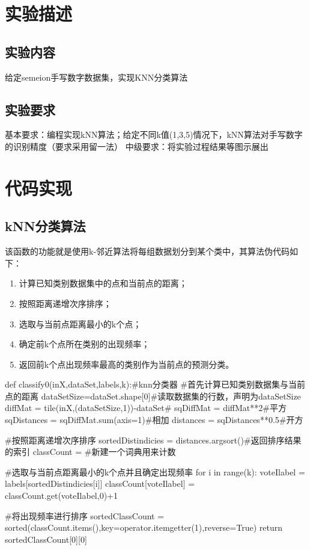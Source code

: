 \documentclass[UTF8,a4paper,10pt]{ctexart}
\begin{document}
\section{实验描述}
\subsection{实验内容}
给定semeion手写数字数据集，实现KNN分类算法
\subsection{实验要求}
基本要求：编程实现kNN算法；给定不同k值(1,3,5)情况下，kNN算法对手写数字的识别精度（要求采用留一法）
中级要求：将实验过程结果等图示展出

\section{代码实现}
\subsection{kNN分类算法}

该函数的功能就是使用k-邻近算法将每组数据划分到某个类中，其算法伪代码如下：

\begin{enumerate}
   \item 计算已知类别数据集中的点和当前点的距离；
   \item 按照距离递增次序排序；
   \item 选取与当前点距离最小的k个点；
   \item 确定前k个点所在类别的出现频率；
   \item 返回前k个点出现频率最高的类别作为当前点的预测分类。
\end{enumerate}
\begin{python}
   def classify0(inX,dataSet,labels,k):#knn分类器
   #首先计算已知类别数据集与当前点的距离
   dataSetSize=dataSet.shape[0]#读取数据集的行数，声明为dataSetSize
   diffMat = tile(inX,(dataSetSize,1))-dataSet#
   sqDiffMat = diffMat**2#平方
   sqDistances = sqDiffMat.sum(axis=1)#相加
   distances = sqDistances**0.5#开方


   #按照距离递增次序排序
   sortedDistindicies = distances.argsort()#返回排序结果的索引
   classCount = {}#新建一个词典用来计数

   #选取与当前点距离最小的k个点并且确定出现频率
   for i in range(k):
       voteIlabel = labels[sortedDistindicies[i]]
       classCount[voteIlabel] = classCount.get(voteIlabel,0)+1

   #将出现频率进行排序
   sortedClassCount = sorted(classCount.items(),key=operator.itemgetter(1),reverse=True)
   return sortedClassCount[0][0]

\end{python}
\end{document}
